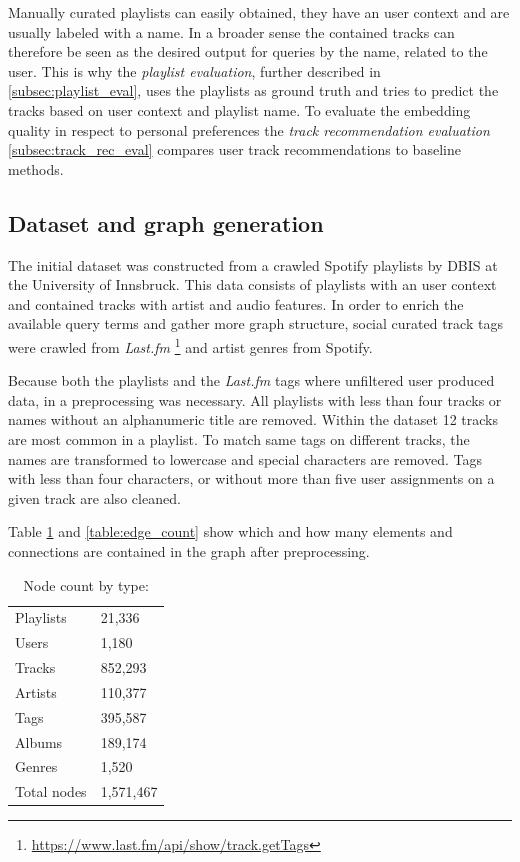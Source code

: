 \documentclass[sigconf]{acmart}
\begin{document}
Manually curated playlists can easily obtained, they have an user context and are usually labeled with a name. In a broader sense the contained tracks can therefore be seen as the desired output for queries by the name, related to the user. This is why the \emph{playlist evaluation}, further described in \ref{subsec:playlist_eval}, uses the playlists as ground truth and tries to predict the tracks based on user context and playlist name. To evaluate the embedding quality in respect to personal preferences the \emph{track recommendation evaluation} \ref{subsec:track_rec_eval} compares user track recommendations to baseline methods.


\subsection{Dataset and graph generation}
The initial dataset was constructed from a crawled Spotify playlists by DBIS at the University of Innsbruck\cite{pichl2017improving}. This data consists of playlists with an user context and contained tracks with artist and audio features. In order to enrich the available query terms and gather more graph structure, social curated track tags were crawled from \emph{Last.fm} \footnote{\url{https://www.last.fm/api/show/track.getTags}} and artist genres from Spotify.

Because both the playlists and the \emph{Last.fm} tags where unfiltered user produced data, in a preprocessing was necessary. All playlists with less than four tracks or names without an alphanumeric title are removed. Within the dataset 12 tracks are most common in a playlist. To match same tags on different tracks, the names are transformed to lowercase and special characters are removed. Tags with less than four characters, or without more than five user assignments on a given track are also cleaned.

Table \ref{table:node_count} and \ref{table:edge_count} show which and how many elements and connections are contained in the graph after preprocessing.

\begin{table}[H]
	\caption{Node count by type:}
	\label{table:node_count}
	\begin{tabular}{l|l}
		Playlists & 21,336  \\
		Users     & 1,180     \\
		Tracks    & 852,293 \\
		Artists   & 110,377  \\
		Tags      & 395,587    \\
		Albums    & 189,174    \\
		Genres	  & 1,520	\\\hline
		Total nodes & 1,571,467
	\end{tabular}
\end{table}
\end{document}
